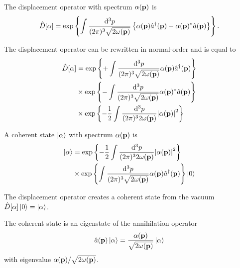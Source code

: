 \begin{definition}
	The displacement operator with spectrum $\alpha(\vb{p})$ is
	\begin{equation}
		\hat{D}[\alpha]
		=
		\exp\left\{
			\int\frac{\dd[3]{p}}{(2\pi)^3\sqrt{2\omega(\vb{p})}}
			\left\{
				\alpha(\vb{p})
				\hat{a}^\dagger(\vb{p})
				-
				\alpha(\vb{p})^*
				\hat{a}(\vb{p})
			\right\}
		\right\}
		\label{eq:displacement_operator}
		.
	\end{equation}
\end{definition}
\begin{lemma}\label{thm:displacement_operator_normal_ordered}
	The displacement operator can be rewritten in normal-order and is equal to
	\begin{equation}
		\begin{split}
			\hat{D}[\alpha]
			&=
			\exp\left\{
				+
				\int\frac{\dd[3]{p}}{(2\pi)^3\sqrt{2\omega(\vb{p})}}
				\alpha(\vb{p})
				\hat{a}^\dagger(\vb{p})
			\right\}
			\\
			&\times
			\exp\left\{
				-
				\int\frac{\dd[3]{p}}{(2\pi)^3\sqrt{2\omega(\vb{p})}}
				\alpha(\vb{p})^*
				\hat{a}(\vb{p})
			\right\}
			\\
			&\times
			\exp\left\{
				-
				\frac{1}{2}
				\int\frac{\dd[3]{p}}{(2\pi)^32\omega(\vb{p})}
				\abs{\alpha(\vb{p})}^2
			\right\}
		\end{split}
		\label{eq:displacement_operator_normal}
	\end{equation}
\end{lemma}
\begin{definition}
	A coherent state $\ket{\alpha}$ with spectrum $\alpha(\vb{p})$ is
	\begin{equation}
		\begin{split}
			\ket{\alpha}
			&=
			\exp\left\{
				-
				\frac{1}{2}
				\int\frac{\dd[3]{p}}{(2\pi)^32\omega(\vb{p})}
				\abs{\alpha(\vb{p})}^2
			\right\}
			\\
			&\times
			\exp\left\{
				\int\frac{\dd[3]{p}}{(2\pi)^3\sqrt{2\omega(\vb{p})}}
				\alpha(\vb{p})
				\hat{a}^\dagger(\vb{p})
			\right\}
			\ket{0}
		\end{split}
	\end{equation}
\end{definition}
\begin{lemma}
	The displacement operator creates a coherent state from the vacuum $\hat{D}[\alpha]\ket{0}=\ket{\alpha}$.
\end{lemma}
\begin{theorem}\label{thm:coherent_state_annihilation_eigenvalue}
	The coherent state is an eigenstate of the annihilation operator
	\begin{equation}
		\hat{a}(\vb{p})
		\ket{\alpha}
		=
		\frac{\alpha(\vb{p})}{\sqrt{2\omega(\vb{p})}}
		\ket{\alpha}
	\end{equation}
	with eigenvalue $\alpha(\vb{p})/\sqrt{2\omega(\vb{p})}$.
\end{theorem}
